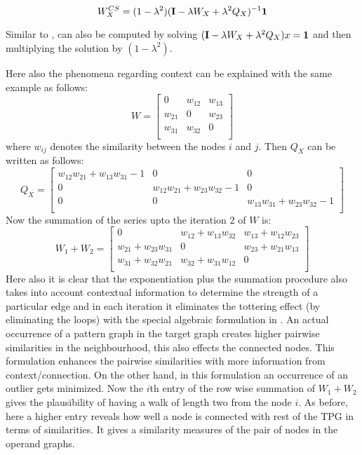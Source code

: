 \begin{equation}
W^{CS}_X = (1-\lambda^2)(\mathbf{I} - \lambda W_X+\lambda^{2} Q_X)^{-1}\mathbf{1}
\label{eqn:pg:btlw4}
\end{equation}

Similar to ,  can also be computed by solving $(\mathbf{I} - \lambda W_X+\lambda^{2} Q_X)x=\mathbf{1}$ and then multiplying the solution by $(1-\lambda^2)$.

Here also the phenomena regarding context can be explained with the same example as follows:
\[W = 
\begin{bmatrix}
0		&w_{12}	&w_{13}\\
w_{21}	&0		&w_{23}\\
w_{31}	&w_{32}	&0\\
\end{bmatrix}
\]
where $w_{ij}$ denotes the similarity between the nodes $i$ and $j$. Then $Q_X$ can be written as follows:
\[Q_X =
\begin{bmatrix}
w_{12}w_{21}+w_{13}w_{31}-1	&0								&0\\
0							&w_{12}w_{21}+w_{23}w_{32}-1		&0\\
0							&0								&w_{13}w_{31}+w_{23}w_{32}-1\\
\end{bmatrix}
\]
Now the summation of the series upto the iteration $2$ of $W$ is:
\[W_1+W_2=
\begin{bmatrix}
0							&w_{12}+w_{13}w_{32}			&w_{13}+w_{12}w_{23}\\
w_{21}+w_{23}w_{31}		 	&0							&w_{23}+w_{21}w_{13}\\
w_{31}+w_{32}w_{21}			&w_{32}+w_{31}w_{12}			&0\\
\end{bmatrix}
\]
Here also it is clear that the exponentiation plus the summation procedure also takes into account contextual information to determine the strength of a particular edge and in each iteration it eliminates the tottering effect (by eliminating the loops) with the special algebraic formulation in . An actual occurrence of a pattern graph in the target graph creates higher pairwise similarities in the neighbourhood, this also effects the connected nodes. This formulation enhances the pairwise similarities with more information from context/connection. On the other hand, in this formulation an occurrence of an outlier gets minimized. Now the $i$th entry of the row wise summation of $W_1+W_2$ gives the plausibility of having a walk of length two from the node $i$. As before, here a higher entry reveals how well a node is connected with rest of the TPG in terms of similarities. It gives a similarity measures of the pair of nodes in the operand graphs.

